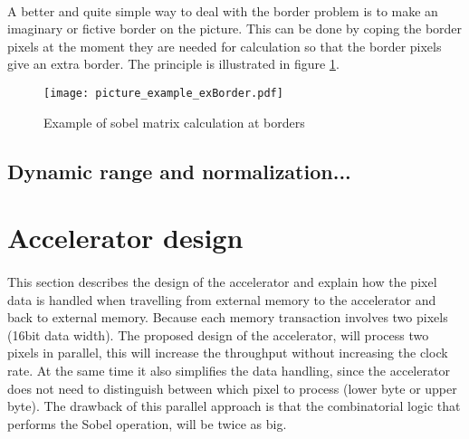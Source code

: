 \paragraph*{}
A better and quite simple way to deal with the border problem is to make an imaginary or fictive border on the picture. This  can be done by coping the border pixels at the moment they are needed for calculation so that the border pixels give an extra border. The principle is illustrated in figure \ref{fig:pic_matrix_exBorder}.

\begin{figure}[H]
	\centering
	\texttt{[image: picture\_example\_exBorder.pdf]}
	\caption{Example of sobel matrix calculation at borders}
	\label{fig:pic_matrix_exBorder}
\end{figure}  

\subsection{Dynamic range and normalization...}
\paragraph*{}

\section{Accelerator design} 
\label{sec:AccDesign}
\paragraph*{}
This section describes the design of the accelerator and explain how the pixel data is handled when travelling from external memory to the accelerator and back to external memory. 
Because each memory transaction involves two pixels (16bit data width). The proposed design of the accelerator, will process two pixels in parallel, this will increase the throughput without increasing the clock rate. At the same time it also simplifies the data handling, since the accelerator does not need to distinguish between which pixel to process (lower byte or upper byte). The drawback of this parallel approach is that the combinatorial logic that performs the Sobel operation, will be twice as big.

